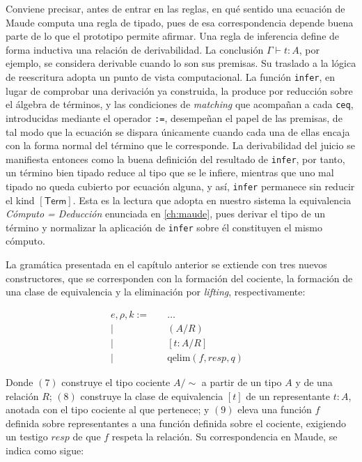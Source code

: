 Conviene precisar, antes de entrar en las reglas, en qué sentido una ecuación de Maude computa una regla de tipado, pues de esa correspondencia depende buena parte de lo que el prototipo permite afirmar. Una regla de inferencia define de forma inductiva una relación de derivabilidad. La conclusión $\Gamma \vdash t : A$, por ejemplo, se considera derivable cuando lo son sus premisas. Su traslado a la lógica de reescritura adopta un punto de vista computacional. La función \texttt{infer}, en lugar de comprobar una derivación ya construida, la produce por reducción sobre el álgebra de términos, y las condiciones de \textit{matching} que acompañan a cada \texttt{ceq}, introducidas mediante el operador \texttt{:=}, desempeñan el papel de las premisas, de tal modo que la ecuación se dispara únicamente cuando cada una de ellas encaja con la forma normal del término que le corresponde. La derivabilidad del juicio se manifiesta entonces como la buena definición del resultado de \texttt{infer}, por tanto, un término bien tipado reduce al tipo que se le infiere, mientras que uno mal tipado no queda cubierto por ecuación alguna, y así, \texttt{infer} permanece sin reducir el kind $[\mathsf{Term}]$. Esta es la lectura que adopta en nuestro sistema la equivalencia \textit{Cómputo = Deducción} enunciada en \cref{ch:maude}, pues derivar el tipo de un término y normalizar la aplicación de \texttt{infer} sobre él constituyen el mismo cómputo.

La gramática presentada en el capítulo anterior se extiende con tres nuevos constructores, que se corresponden con la formación del cociente, la formación de una clase de equivalencia y la eliminación por \textit{lifting}, respectivamente:

\begin{align}
e, \rho, k := \quad & \dots & \tag{$\ast$}\\
  \mid \quad & (A / R) & \tag{7}\\
  \mid \quad & [t : A / R] & \tag{8}\\
  \mid \quad & \mathrm{qelim}(f, \mathit{resp}, q) & \tag{9}
\end{align}

Donde $(7)$ construye el tipo cociente $A/{\sim}$ a partir de un tipo $A$ y de una
relación $R$; $(8)$ construye la clase de equivalencia $[t]$ de
un representante $t : A$, anotada con el tipo cociente al que pertenece; y $(9)$ eleva una función $f$ definida sobre representantes a una función definida sobre el cociente, exigiendo un testigo $\mathit{resp}$ de que $f$ respeta la relación. Su correspondencia en Maude, se indica como sigue:

